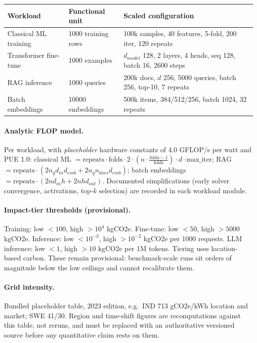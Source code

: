 \documentclass{article}
\begin{document}
\begin{center}
\small
\begin{tabular}{lll}
\toprule
Workload & Functional unit & Scaled configuration \\
\midrule
Classical ML training & 1000 training rows & 100k samples, 40 features, 5-fold, 200 iter, 120 repeats \\
Transformer fine-tune & 1000 examples & $d_{model}$ 128, 2 layers, 4 heads, seq 128, batch 16, 2600 steps \\
RAG inference & 1000 queries & 200k docs, $d$ 256, 5000 queries, batch 256, top-10, 7 repeats \\
Batch embeddings & 10000 embeddings & 500k items, 384/512/256, batch 1024, 32 repeats \\
\bottomrule
\end{tabular}
\end{center}

\paragraph{Analytic FLOP model.} Per workload, with \emph{placeholder}
hardware constants of 4.0 GFLOP/s per watt and PUE 1.0:
classical ML $= \text{repeats} \cdot \text{folds} \cdot 2 \cdot (n \cdot
\frac{\text{folds}-1}{\text{folds}}) \cdot d \cdot \text{max\_iter}$;
RAG $= \text{repeats} \cdot (2 n_q d_{in} d_{emb} + 2 n_q n_{docs} d_{emb})$;
batch embeddings $= \text{repeats} \cdot (2 n d_{in} h + 2 n h d_{out})$.
Documented simplifications (early solver convergence, activations, top-$k$
selection) are recorded in each workload module.

\paragraph{Impact-tier thresholds (provisional).} Training: low $<100$, high
$>10^4$ kgCO2e. Fine-tune: low $<50$, high $>5000$ kgCO2e. Inference: low
$<10^{-3}$, high $>10^{-2}$ kgCO2e per 1000 requests. LLM inference: low $<1$,
high $>10$ kgCO2e per 1M tokens. Tiering uses location-based carbon. These
remain provisional: benchmark-scale runs sit orders of magnitude below the low
ceilings and cannot recalibrate them.

\paragraph{Grid intensity.} Bundled placeholder table, 2023 edition, e.g.\ IND
713 gCO2e/kWh location and market; SWE 41/30. Region and time-shift figures are
recomputations against this table, not reruns, and must be replaced with an
authoritative versioned source before any quantitative claim rests on them.
\end{document}
